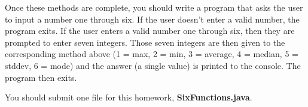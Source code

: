 \documentclass[paper=a4, fontsize=11pt, parskip=full]{scrartcl} %
\numberwithin{equation}{section} %
\numberwithin{figure}{section} %
\numberwithin{table}{section} %
\begin{document}
Once these methods are complete, you should write a program that asks the user to input a number one through six. If the user doesn't enter a valid number, the program exits. If the user enters a valid number one through six, then they are prompted to enter seven integers. Those seven integers are then given to the corresponding method above (1 = max, 2 = min, 3 = average, 4 = median, 5 = stddev, 6 = mode) and the answer (a single value) is printed to the console. The program then exits.

You should submit one file for this homework, \textbf{SixFunctions.java}.


\end{document}
